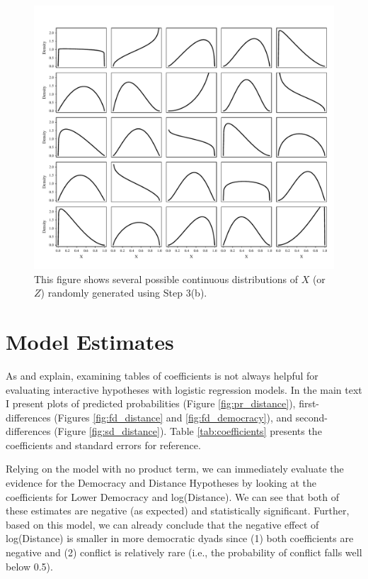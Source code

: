 \documentclass[12pt]{article}
\begin{document}
\begin{appendix}
                                \begin{figure}[h]
        \begin{center}
        \includegraphics[width = \linewidth]{fig/fig_distribution_sample.pdf}
        \end{center}\caption{This figure shows several possible continuous distributions of $X$ (or $Z$) randomly generated using Step 3(b). }\label{fig:distribution_sample}
        \end{figure}
        
\clearpage        
        
\section*{Model Estimates}

As \cite{BramborClarkGolder2006} and \cite{BerryDeMerittEsarey2010} explain, examining tables of coefficients is not always helpful for evaluating interactive hypotheses with logistic regression models. In the main text I present plots of predicted probabilities (Figure \ref{fig:pr_distance}), first-differences (Figures \ref{fig:fd_distance} and \ref{fig:fd_democracy}), and second-differences (Figure \ref{fig:sd_distance}). Table \ref{tab:coefficients} presents the coefficients and standard errors for reference.

Relying on the model with no product term, we can immediately evaluate the evidence for the Democracy and Distance Hypotheses by looking at the coefficients for Lower Democracy and log(Distance). We can see that both of these estimates are negative (as expected) and statistically significant. Further, based on this model, we can already conclude that the negative effect of log(Distance) is smaller in more democratic dyads since (1) both coefficients are negative and (2) conflict is relatively rare (i.e., the probability of conflict falls well below 0.5).


\end{appendix}
\end{document}
